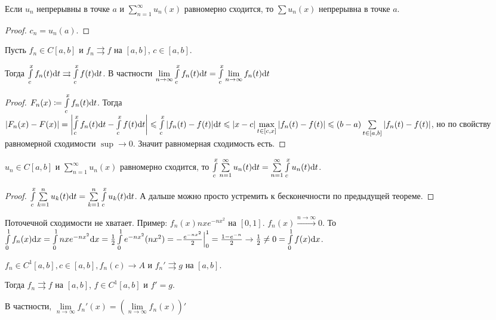 \begin{consequence}
    Если $u_n$ непрерывны в точке  $a$ и  $\sum\limits_{n=1}^\infty u_n(x)$ равномерно сходится, то  $\sum u_n(x)$ непрерывна в точке  $a$.
\end{consequence}
\begin{proof}
    $c_n = u_n(a)$.
\end{proof}
\begin{theorem}
    Пусть $f_n \in C[a, b]$ и  $f_n \rightrightarrows f$ на  $[a, b]$, $c \in [a,b]$.

    Тогда $\int\limits_c^x f_n(t)\mathrm{d}t \rightrightarrows \int\limits_c^x f(t)\mathrm{d}t$. В частности $\lim\limits_{n \to \infty} \int\limits_c^x f_n(t)\mathrm{d}t = \int\limits_c^x \lim\limits_{n \to \infty} f_n(t)\mathrm{d}t$

\end{theorem}
\begin{proof}
    $F_n(x) \coloneqq \int\limits_c^x f_n(t) \mathrm{d}t$. Тогда  $|F_n(x) - F(x)| = \left|\int\limits_c^xf_n(t)\mathrm{d}t - \int\limits_c^x f(t)\mathrm{d}t\right| \leqslant \int\limits_c^x |f_n(t) - f(t)| \mathrm{d}t \leqslant |x-c|\max\limits_{t \in [c, x]} |f_n(t) - f(t)| \leqslant (b-a)\sum\limits_{t \in [a, b]} |f_n(t) - f(t)|$, но по свойству равномерной сходимости $\sup \to 0$. Значит равномерная сходимость есть.
\end{proof}
\begin{consequence}
    $u_n \in C[a, b]$ и  $\sum\limits_{n=1}^\infty u_n(x)$ равномерно сходится, то $\int\limits_c^x \sum\limits_{n=1}^\infty u_n(t)\mathrm{d}t = \sum\limits_{n=1}^\infty \int\limits_c^x u_n(t)\mathrm{d}t$.
\end{consequence}
\begin{proof}
    $\int\limits_c^x\sum\limits_{k=1}^n u_k(t)\mathrm{d}t = \sum\limits_{k=1}^n \int\limits_c^x u_k(t)\mathrm{d}t$. А дальше можно просто устремить к бесконечности по предыдущей теореме.
\end{proof}
\begin{remark}
    Поточечной сходимости не хватает. Пример: $f_n(x) nxe^{-nx^2}$ на  $[0, 1]$.  $f_n(x) \xrightarrow{n \to \infty} 0$. То $\int\limits_0^1 f_n(x) \mathrm{d}x = \int\limits_0^1 nxe^{-nx^2}\mathrm{d}x = \frac{1}{2} \int\limits_0^1 e^{-nx^2} \mathrm(nx^2) = -\frac{e^{-nx^2}}{2} \Big|_0^1 = \frac{1-e^{-n}}{2} \to \frac{1}{2} \neq 0 = \int\limits_0^1 f(x)\mathrm{d}x$.
\end{remark}
\begin{theorem}
    $f_n \in C^1[a, b], c \in [a, b], f_n(c) \to A$ и  $f_n' \rightrightarrows g$ на $[a, b]$. 
    
    Тогда  $f_n \rightrightarrows f$ на  $[a, b]$,  $f \in C^1[a, b]$ и $f' = g$.

    В частности, $\lim\limits_{n \to \infty} f_n'(x) = (\lim\limits_{n \to \infty} f_n(x))'$
\end{theorem}
